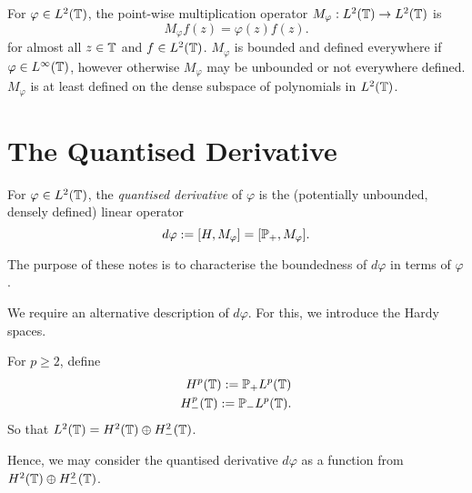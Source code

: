 \documentclass{unswmaths}
\begin{document}
For $\varphi \in L^2(\mathbb{T})$, the point-wise multiplication operator $M_\varphi:L^2(\mathbb{T})\rightarrow L^2(\mathbb{T})$
is
\begin{equation*}
    M_\varphi f(z) = \varphi(z)f(z).
\end{equation*}
for almost all $z \in \mathbb{T}$ and $f \in L^2(\mathbb{T})$. $M_\varphi$ is bounded and defined everywhere if $\varphi \in L^\infty(\mathbb{T})$, however
otherwise $M_\varphi$ may be unbounded or not everywhere defined. $M_\varphi$ is at least defined on the dense subspace
of polynomials in $L^2(\mathbb{T})$. 

\section*{The Quantised Derivative}

\begin{definition}
    For $\varphi \in L^2(\mathbb{T})$, the \emph{quantised derivative} of $\varphi$ is the (potentially unbounded, densely defined) linear operator
    \begin{equation*}
        d\varphi := [H,M_\varphi] = [\mathbb{P}_+,M_\varphi].
    \end{equation*}
\end{definition}
The purpose of these notes is to characterise the boundedness of $d\varphi$ in terms of $\varphi$.

We require an alternative description of $d\varphi$. For this, we introduce the Hardy spaces.
\begin{definition}
    For $p\geq 2$, define
    \begin{align*}
        H^p(\mathbb{T}) := \mathbb{P}_+ L^p(\mathbb{T})\\
        H^p_-(\mathbb{T}) := \mathbb{P}_- L^p(\mathbb{T}).
    \end{align*}
    So that $L^2(\mathbb{T}) = H^2(\mathbb{T})\oplus H^2_-(\mathbb{T})$. 
\end{definition}

Hence, we may consider the quantised derivative $d\varphi$ as a function from $H^2(\mathbb{T})\oplus H^2_-(\mathbb{T})$.
\end{document}
